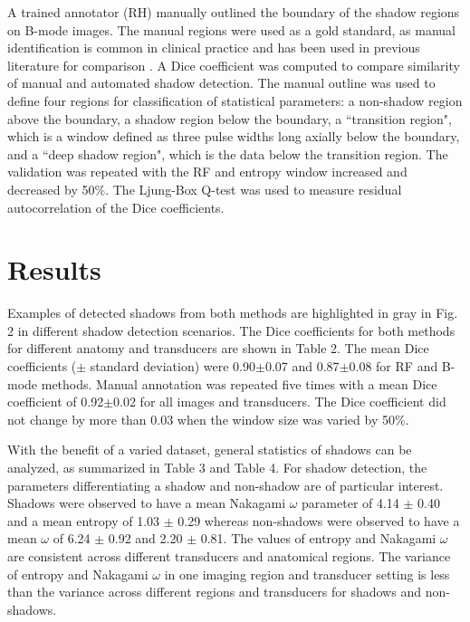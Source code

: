 \documentclass[authoryear,preprint,review,12pt]{elsarticle}
\begin{document}
A trained annotator (RH) manually outlined the boundary of the shadow regions on B-mode images. The manual regions were used as a gold standard, as manual identification is common in clinical practice and has been used in previous literature for comparison \citep{Hellier2010}. A Dice coefficient was computed to compare similarity of manual and automated shadow detection. The manual outline was used to define four regions for classification of statistical parameters: a non-shadow region above the boundary, a shadow region below the boundary, a ``transition region", which is a window defined as three pulse widths long axially below the boundary, and a ``deep shadow region", which is the data below the transition region. The validation was repeated with the RF and entropy window increased and decreased by 50\%. The Ljung-Box Q-test was used to measure residual autocorrelation of the Dice coefficients.
%
\section*{Results}
\label{Results}
Examples of detected shadows from both methods are highlighted in gray in Fig. 2 in different shadow detection scenarios. The Dice coefficients for both methods for different anatomy and transducers are shown in Table 2. The mean Dice coefficients ($\pm$ standard deviation) were 0.90$\pm$0.07 and 0.87$\pm$0.08 for RF and B-mode methods. Manual annotation was repeated five times with a mean Dice coefficient of 0.92$\pm$0.02 for all images and transducers. The Dice coefficient did not change by more than 0.03 when the window size was varied by 50\%.

With the benefit of a varied dataset, general statistics of shadows can be analyzed, as summarized in Table 3 and Table 4. For shadow detection, the parameters differentiating a shadow and non-shadow are of particular interest. Shadows were observed to have a mean Nakagami $\omega$ parameter of 4.14 $\pm$ 0.40 and a mean entropy of 1.03 $\pm$ 0.29 whereas non-shadows were observed to have a mean $\omega$ of 6.24 $\pm$ 0.92 and 2.20 $\pm$ 0.81. The values of entropy and Nakagami $\omega$ are consistent across different transducers and anatomical regions. The variance of entropy and Nakagami $\omega$ in one imaging region and transducer setting is less than the variance across different regions and transducers for shadows and non-shadows. 


\end{document}
